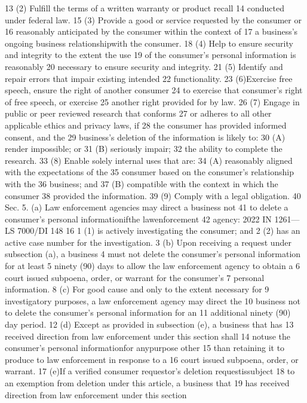 13 (2) Fulfill the terms of a written warranty or product recall
14 conducted under federal law.
15 (3) Provide a good or service requested by the consumer or
16 reasonably anticipated by the consumer within the context of
17 a business's ongoing business relationshipwith the consumer.
18 (4) Help to ensure security and integrity to the extent the use
19 of the consumer's personal information is reasonably
20 necessary to ensure security and integrity.
21 (5) Identify and repair errors that impair existing intended
22 functionality.
23 (6)Exercise free speech, ensure the right of another consumer
24 to exercise that consumer's right of free speech, or exercise
25 another right provided for by law.
26 (7) Engage in public or peer reviewed research that conforms
27 or adheres to all other applicable ethics and privacy laws, if
28 the consumer has provided informed consent, and the
29 business's deletion of the information is likely to:
30 (A) render impossible; or
31 (B) seriously impair;
32 the ability to complete the research.
33 (8) Enable solely internal uses that are:
34 (A) reasonably aligned with the expectations of the
35 consumer based on the consumer's relationship with the
36 business; and
37 (B) compatible with the context in which the consumer
38 provided the information.
39 (9) Comply with a legal obligation.
40 Sec. 5. (a) Law enforcement agencies may direct a business not
41 to delete a consumer's personal informationifthe lawenforcement
42 agency:
2022 IN 1261—LS 7000/DI 148
16
1 (1) is actively investigating the consumer; and
2 (2) has an active case number for the investigation.
3 (b) Upon receiving a request under subsection (a), a business
4 must not delete the consumer's personal information for at least
5 ninety (90) days to allow the law enforcement agency to obtain a
6 court issued subpoena, order, or warrant for the consumer's
7 personal information.
8 (c) For good cause and only to the extent necessary for
9 investigatory purposes, a law enforcement agency may direct the
10 business not to delete the consumer's personal information for an
11 additional ninety (90) day period.
12 (d) Except as provided in subsection (e), a business that has
13 received direction from law enforcement under this section shall
14 notuse the consumer's personal informationfor anypurpose other
15 than retaining it to produce to law enforcement in response to a
16 court issued subpoena, order, or warrant.
17 (e)If a verified consumer requestor's deletion requestissubject
18 to an exemption from deletion under this article, a business that
19 has received direction from law enforcement under this section

